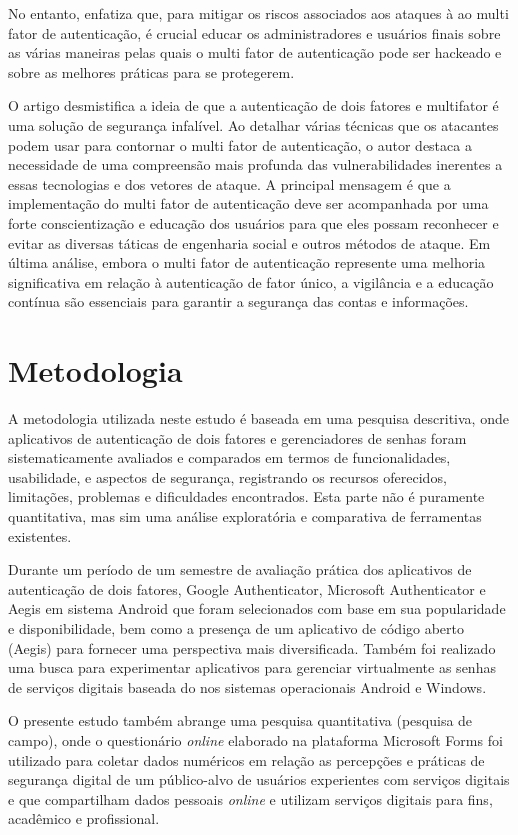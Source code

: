 \documentclass[12pt]{article}
\begin{document}
No entanto, \cite{article:3} enfatiza que, para mitigar os riscos associados aos ataques à
ao multi fator de autenticação, é crucial educar os administradores e usuários finais sobre
as várias maneiras pelas quais o multi fator de autenticação pode ser hackeado e sobre as
melhores práticas para se protegerem.

O artigo \cite{article:3} desmistifica a ideia de que a autenticação de dois fatores e
multifator é uma solução de segurança infalível.
Ao detalhar várias técnicas que os atacantes podem usar para contornar o multi fator de
autenticação, o autor destaca a necessidade de uma compreensão mais profunda das
vulnerabilidades inerentes a essas tecnologias e dos vetores de ataque.
A principal mensagem é que a implementação do multi fator de autenticação deve ser
acompanhada por uma forte conscientização e educação dos usuários para que eles possam
reconhecer e evitar as diversas táticas de engenharia social e outros métodos de ataque.
Em última análise, embora o multi fator de autenticação represente uma melhoria
significativa em relação à autenticação de fator único, a vigilância e a educação
contínua são essenciais para garantir a segurança das contas e informações.

\section{Metodologia}

A metodologia utilizada neste estudo é baseada em uma pesquisa descritiva,
onde aplicativos de autenticação de dois fatores e gerenciadores de senhas
foram sistematicamente avaliados e comparados em termos de funcionalidades,
usabilidade, e aspectos de segurança, registrando os recursos oferecidos,
limitações, problemas e dificuldades encontrados.
Esta parte não é puramente quantitativa, mas sim uma análise exploratória
e comparativa de ferramentas existentes.

Durante um período de um semestre de avaliação prática dos aplicativos
de autenticação de dois fatores, Google Authenticator, Microsoft Authenticator
e Aegis em sistema Android que foram selecionados com base em sua
popularidade e disponibilidade, bem como a presença de um aplicativo de
código aberto (Aegis) para fornecer uma perspectiva mais diversificada.
Também foi realizado uma busca para experimentar aplicativos para gerenciar
virtualmente as senhas de serviços digitais baseada do nos sistemas
operacionais Android e Windows.

O presente estudo também abrange uma pesquisa quantitativa (pesquisa de campo),
onde o questionário \textit{online} \cite{forms2025} elaborado na plataforma
Microsoft Forms foi utilizado para coletar dados numéricos em relação as
percepções e práticas de segurança digital de um público-alvo de usuários
experientes com serviços digitais e que compartilham dados pessoais
\textit{online} e utilizam serviços digitais para fins, acadêmico e
profissional.
\end{document}
